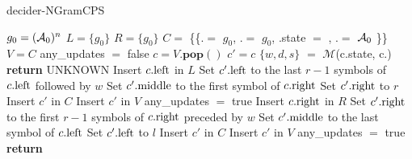 \begin{algorithm}
    \caption{{\sc decider-NGramCPS}}\label{alg:NGramCPS}

    \begin{algorithmic}[1]

        \State $g_0 = (\mathcal{A}_0)^n$ 
        \State $L = \{ g_0 \}$ 
        \State $R = \{ g_0 \}$ 
        \State $C =$ \{\{.\leftngram $=$ $g_0$, .\rightngram $=$ $g_0$, .state $=$ \stateA, .\middlesymbol $=$ $\mathcal{A}_0$ \}\} 
        \label{alg:NGramCPS:line:whileTrue}
        \State $V = C$
        \State any\_updates $=$ false
        \State $c = V.\textbf{pop}()$ 
        \State $c' = c$
        \State $\{w,d,s\}$ $=$ $\mathcal{M}$(c.state, c.\middlesymbol) 
        \State {} 
        \State \textbf{return} UNKNOWN\label{alg:NGramCPS:line:unknown}
        \EndIf
        \State {}
        \State Insert $c.\text{left}$ in $L$ \label{alg:NGramCPS:line:insertL}
        \State Set $c'.\text{left}$ to the last $r-1$ symbols of $c.\text{left}$ followed by $w$
        \State Set $c'.\text{middle}$ to the first symbol of $c.\text{right}$
        \State Set $c'.\text{right}$ to $r$
        \State \tabi Insert $c'$ in $C$ \label{alg:NGramCPS:line:insertInConfSet}
        \State \tabi Insert $c'$ in $V$ \label{alg:NGramCPS:line:insertInConfSetToVisit}
        \State \tabi any\_updates $=$ true
        \EndIf
        \EndFor
        \EndIf
        \State {} \label{alg:NGramCPS:line:moveLeft}
        \State Insert $c.\text{right}$ in $R$
        \State Set $c'.\text{right}$ to the first $r-1$ symbols of $c.\text{right}$ preceded by $w$
        \State Set $c'.\text{middle}$ to the last symbol of $c.\text{left}$
        \State Set $c'.\text{left}$ to $l$
        \State \tabi Insert $c'$ in $C$
        \State \tabi Insert $c'$ in $V$
        \State \tabi any\_updates $=$ true
        \EndIf
        \EndFor
        \EndIf
        \EndWhile
        \State {}
        \State \textbf{return} \NONHALT\label{alg:NGramCPS:line:nonhalt} 
        \EndIf


\end{algorithmic}
\end{algorithm}
